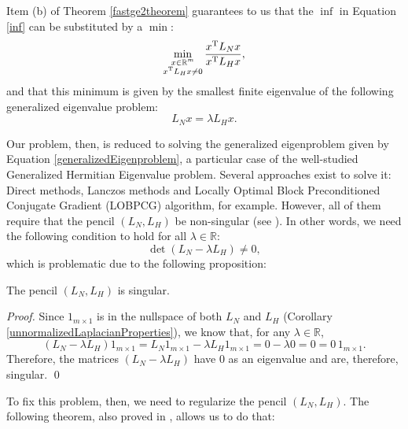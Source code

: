 Item (b) of Theorem \vref{fastge2theorem} guarantees to us that the $\inf$ in Equation \vref{inf} can be substituted by a $\min$:
\begin{equation}\label{min}
   \min_{\substack{x \in \mathbb R^m \\ x^{\rm T} L_H x \ne 0}} \frac{x^{\rm T} L_N x}{x^{\rm T} L_H x},
\end{equation}
and that this minimum is given by the smallest finite eigenvalue of the following generalized eigenvalue problem:
\begin{equation}\label{generalizedEigenproblem}
   L_N x = \lambda L_H x.
\end{equation}

Our problem, then, is reduced to solving the generalized eigenproblem given by Equation \vref{generalizedEigenproblem}, a particular case of the well-studied Generalized Hermitian Eigenvalue problem.
Several approaches exist to solve it: Direct methods, Lanczos methods and Locally Optimal Block Preconditioned Conjugate Gradient (LOBPCG) algorithm, for example. 
However, all of them require that the pencil $(L_N, L_H)$ be non-singular (see \cite{templates}).
In other words, we need the following condition to hold for all $\lambda \in \mathbb R$:
\begin{equation}
   \det (L_N - \lambda L_H) \ne 0,
\end{equation}
which is problematic due to the following proposition:

\begin{proposition} \label{huesing}
   The pencil $(L_N, L_H)$ is singular.
\end{proposition}

\begin{proof}
   Since $1_{m \times 1}$ is in the nullspace of both $L_N$ and $L_H$ (Corollary \vref{unnormalizedLaplacianProperties}), we know that, for any $\lambda \in \mathbb R$,
   \begin{equation*}
      (L_N - \lambda L_H) 1_{m \times 1} = L_N 1_{m \times 1} - \lambda L_H 1_{m \times 1} = 0 - \lambda 0 = 0 = 0 \, 1_{m \times 1}.
   \end{equation*}
   Therefore, the matrices $(L_N - \lambda L_H)$ have $0$ as an eigenvalue and are, therefore, singular. \qed
\end{proof}

To fix this problem, then, we need to regularize the pencil $(L_N, L_H)$.
The following theorem, also proved in \cite{fastge2}, allows us to do that:

